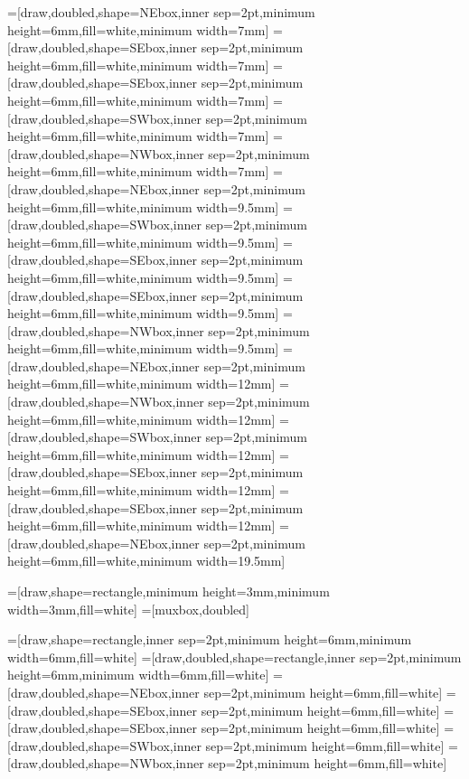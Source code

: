 =[draw,doubled,shape=NEbox,inner sep=2pt,minimum height=6mm,fill=white,minimum width=7mm]
=[draw,doubled,shape=SEbox,inner sep=2pt,minimum height=6mm,fill=white,minimum width=7mm]
=[draw,doubled,shape=SEbox,inner sep=2pt,minimum height=6mm,fill=white,minimum width=7mm]
=[draw,doubled,shape=SWbox,inner sep=2pt,minimum height=6mm,fill=white,minimum width=7mm]
=[draw,doubled,shape=NWbox,inner sep=2pt,minimum height=6mm,fill=white,minimum width=7mm]
=[draw,doubled,shape=NEbox,inner sep=2pt,minimum height=6mm,fill=white,minimum width=9.5mm]
=[draw,doubled,shape=SWbox,inner sep=2pt,minimum height=6mm,fill=white,minimum width=9.5mm]
=[draw,doubled,shape=SEbox,inner sep=2pt,minimum height=6mm,fill=white,minimum width=9.5mm]
=[draw,doubled,shape=SEbox,inner sep=2pt,minimum height=6mm,fill=white,minimum width=9.5mm]
=[draw,doubled,shape=NWbox,inner sep=2pt,minimum height=6mm,fill=white,minimum width=9.5mm]
=[draw,doubled,shape=NEbox,inner sep=2pt,minimum height=6mm,fill=white,minimum width=12mm]
=[draw,doubled,shape=NWbox,inner sep=2pt,minimum height=6mm,fill=white,minimum width=12mm]
=[draw,doubled,shape=SWbox,inner sep=2pt,minimum height=6mm,fill=white,minimum width=12mm]
=[draw,doubled,shape=SEbox,inner sep=2pt,minimum height=6mm,fill=white,minimum width=12mm]
=[draw,doubled,shape=SEbox,inner sep=2pt,minimum height=6mm,fill=white,minimum width=12mm]
=[draw,doubled,shape=NEbox,inner sep=2pt,minimum height=6mm,fill=white,minimum width=19.5mm]

=[draw,shape=rectangle,minimum height=3mm,minimum width=3mm,fill=white]
=[muxbox,doubled]

=[draw,shape=rectangle,inner sep=2pt,minimum height=6mm,minimum width=6mm,fill=white]
=[draw,doubled,shape=rectangle,inner sep=2pt,minimum height=6mm,minimum width=6mm,fill=white]
=[draw,doubled,shape=NEbox,inner sep=2pt,minimum height=6mm,fill=white]
=[draw,doubled,shape=SEbox,inner sep=2pt,minimum height=6mm,fill=white]
=[draw,doubled,shape=SEbox,inner sep=2pt,minimum height=6mm,fill=white]
=[draw,doubled,shape=SWbox,inner sep=2pt,minimum height=6mm,fill=white]
=[draw,doubled,shape=NWbox,inner sep=2pt,minimum height=6mm,fill=white]

